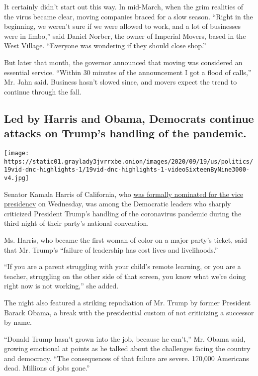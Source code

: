 It certainly didn't start out this way. In mid-March, when the grim
realities of the virus became clear, moving companies braced for a slow
season. ``Right in the beginning, we weren't sure if we were allowed to
work, and a lot of businesses were in limbo,'' said Daniel Norber, the
owner of Imperial Movers, based in the West Village. ``Everyone was
wondering if they should close shop.''

But later that month, the governor announced that moving was considered
an essential service. ``Within 30 minutes of the announcement I got a
flood of calls,'' Mr. Jahn said. Business hasn't slowed since, and
movers expect the trend to continue through the fall.

\hypertarget{led-by-harris-and-obama-democrats-continue-attacks-on-trumps-handling-of-the-pandemic}{%
\subsection{Led by Harris and Obama, Democrats continue attacks on
Trump's handling of the
pandemic.}\label{led-by-harris-and-obama-democrats-continue-attacks-on-trumps-handling-of-the-pandemic}}

\texttt{[image: https://static01.graylady3jvrrxbe.onion/images/2020/09/19/us/politics/19vid-dnc-highlights-1/19vid-dnc-highlights-1-videoSixteenByNine3000-v4.jpg]}

Senator Kamala Harris of California, who
\href{https://www.nytimes3xbfgragh.onion/2020/08/19/us/politics/democratic-national-convention-recap.html}{was
formally nominated for the vice presidency} on Wednesday, was among the
Democratic leaders who sharply criticized President Trump's handling of
the coronavirus pandemic during the third night of their party's
national convention.

Ms. Harris, who became the first woman of color on a major party's
ticket, said that Mr. Trump's ``failure of leadership has cost lives and
livelihoods.''

``If you are a parent struggling with your child's remote learning, or
you are a teacher, struggling on the other side of that screen, you know
what we're doing right now is not working,'' she added.

The night also featured a striking repudiation of Mr. Trump by former
President Barack Obama, a break with the presidential custom of not
criticizing a successor by name.

``Donald Trump hasn't grown into the job, because he can't,'' Mr. Obama
said, growing emotional at points as he talked about the challenges
facing the country and democracy. ``The consequences of that failure are
severe. 170,000 Americans dead. Millions of jobs gone.''


